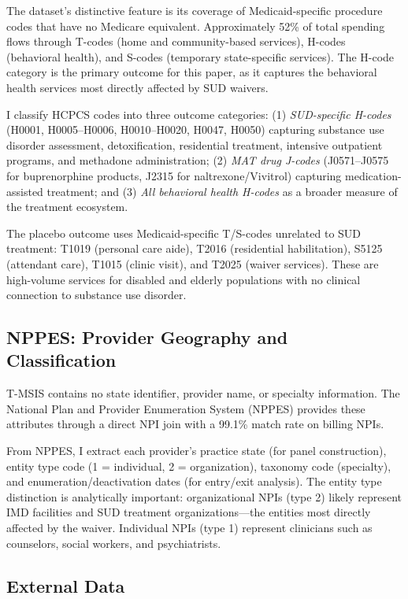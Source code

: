 \documentclass[12pt]{article}
\begin{document}
The dataset's distinctive feature is its coverage of Medicaid-specific procedure codes that have no Medicare equivalent. Approximately 52\% of total spending flows through T-codes (home and community-based services), H-codes (behavioral health), and S-codes (temporary state-specific services). The H-code category is the primary outcome for this paper, as it captures the behavioral health services most directly affected by SUD waivers.

I classify HCPCS codes into three outcome categories: (1) \textit{SUD-specific H-codes} (H0001, H0005--H0006, H0010--H0020, H0047, H0050) capturing substance use disorder assessment, detoxification, residential treatment, intensive outpatient programs, and methadone administration; (2) \textit{MAT drug J-codes} (J0571--J0575 for buprenorphine products, J2315 for naltrexone/Vivitrol) capturing medication-assisted treatment; and (3) \textit{All behavioral health H-codes} as a broader measure of the treatment ecosystem.

The placebo outcome uses Medicaid-specific T/S-codes unrelated to SUD treatment: T1019 (personal care aide), T2016 (residential habilitation), S5125 (attendant care), T1015 (clinic visit), and T2025 (waiver services). These are high-volume services for disabled and elderly populations with no clinical connection to substance use disorder.

\subsection{NPPES: Provider Geography and Classification}

T-MSIS contains no state identifier, provider name, or specialty information. The National Plan and Provider Enumeration System (NPPES) provides these attributes through a direct NPI join with a 99.1\% match rate on billing NPIs.

From NPPES, I extract each provider's practice state (for panel construction), entity type code (1 = individual, 2 = organization), taxonomy code (specialty), and enumeration/deactivation dates (for entry/exit analysis). The entity type distinction is analytically important: organizational NPIs (type 2) likely represent IMD facilities and SUD treatment organizations---the entities most directly affected by the waiver. Individual NPIs (type 1) represent clinicians such as counselors, social workers, and psychiatrists.

\subsection{External Data}
\end{document}
